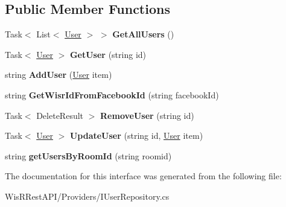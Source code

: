 \subsection*{Public Member Functions}
\begin{DoxyCompactItemize}
\item 
\hypertarget{interface_wis_r_rest_a_p_i_1_1_domain_model_1_1_i_user_repository_aefdeae2e3f0ae76e684bb2e5607904c3}{}Task$<$ List$<$ \hyperlink{class_wis_r_1_1_domain_models_1_1_user}{User} $>$ $>$ {\bfseries Get\+All\+Users} ()\label{interface_wis_r_rest_a_p_i_1_1_domain_model_1_1_i_user_repository_aefdeae2e3f0ae76e684bb2e5607904c3}

\item 
\hypertarget{interface_wis_r_rest_a_p_i_1_1_domain_model_1_1_i_user_repository_a2d382d5302425e82a926a133e90218c8}{}Task$<$ \hyperlink{class_wis_r_1_1_domain_models_1_1_user}{User} $>$ {\bfseries Get\+User} (string id)\label{interface_wis_r_rest_a_p_i_1_1_domain_model_1_1_i_user_repository_a2d382d5302425e82a926a133e90218c8}

\item 
\hypertarget{interface_wis_r_rest_a_p_i_1_1_domain_model_1_1_i_user_repository_a1ea2f4de6ff8eb99dedba548c9997339}{}string {\bfseries Add\+User} (\hyperlink{class_wis_r_1_1_domain_models_1_1_user}{User} item)\label{interface_wis_r_rest_a_p_i_1_1_domain_model_1_1_i_user_repository_a1ea2f4de6ff8eb99dedba548c9997339}

\item 
\hypertarget{interface_wis_r_rest_a_p_i_1_1_domain_model_1_1_i_user_repository_ad568c677d85a0f7929c981a852c409bc}{}string {\bfseries Get\+Wisr\+Id\+From\+Facebook\+Id} (string facebook\+Id)\label{interface_wis_r_rest_a_p_i_1_1_domain_model_1_1_i_user_repository_ad568c677d85a0f7929c981a852c409bc}

\item 
\hypertarget{interface_wis_r_rest_a_p_i_1_1_domain_model_1_1_i_user_repository_a8d781930a3a971e35bf00b1930f707db}{}Task$<$ Delete\+Result $>$ {\bfseries Remove\+User} (string id)\label{interface_wis_r_rest_a_p_i_1_1_domain_model_1_1_i_user_repository_a8d781930a3a971e35bf00b1930f707db}

\item 
\hypertarget{interface_wis_r_rest_a_p_i_1_1_domain_model_1_1_i_user_repository_a6f2a2b06953cd9fb70d42d649d7c6267}{}Task$<$ \hyperlink{class_wis_r_1_1_domain_models_1_1_user}{User} $>$ {\bfseries Update\+User} (string id, \hyperlink{class_wis_r_1_1_domain_models_1_1_user}{User} item)\label{interface_wis_r_rest_a_p_i_1_1_domain_model_1_1_i_user_repository_a6f2a2b06953cd9fb70d42d649d7c6267}

\item 
\hypertarget{interface_wis_r_rest_a_p_i_1_1_domain_model_1_1_i_user_repository_a310478cc6bb132ef85fd3e06ff58d213}{}string {\bfseries get\+Users\+By\+Room\+Id} (string roomid)\label{interface_wis_r_rest_a_p_i_1_1_domain_model_1_1_i_user_repository_a310478cc6bb132ef85fd3e06ff58d213}

\end{DoxyCompactItemize}


The documentation for this interface was generated from the following file\+:\begin{DoxyCompactItemize}
\item 
Wis\+R\+Rest\+A\+P\+I/\+Providers/I\+User\+Repository.\+cs\end{DoxyCompactItemize}
